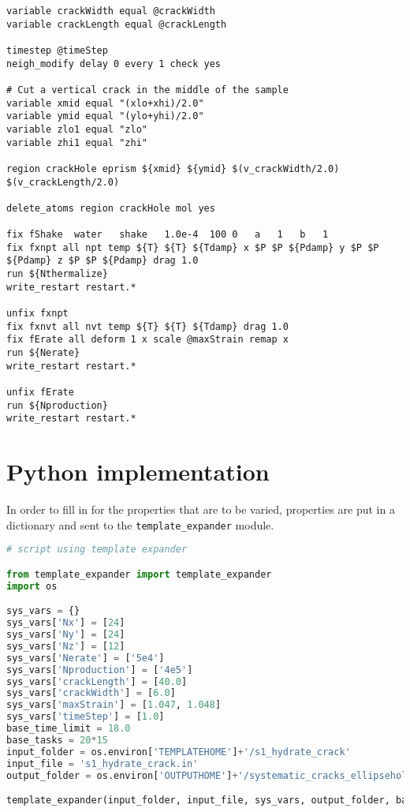\begin{lstlisting}[language=LammpsInput]
variable crackWidth equal @crackWidth
variable crackLength equal @crackLength

timestep @timeStep
neigh_modify delay 0 every 1 check yes

# Cut a vertical crack in the middle of the sample
variable xmid equal "(xlo+xhi)/2.0"
variable ymid equal "(ylo+yhi)/2.0"
variable zlo1 equal "zlo"
variable zhi1 equal "zhi"

region crackHole eprism ${xmid} ${ymid} $(v_crackWidth/2.0) $(v_crackLength/2.0)

delete_atoms region crackHole mol yes

fix	fShake	water 	shake 	1.0e-4  100	0 	a 	1 	b 	1
fix fxnpt all npt temp ${T} ${T} ${Tdamp} x $P $P ${Pdamp} y $P $P ${Pdamp} z $P $P ${Pdamp} drag 1.0
run ${Nthermalize}
write_restart restart.*

unfix fxnpt
fix fxnvt all nvt temp ${T} ${T} ${Tdamp} drag 1.0
fix fErate all deform 1 x scale @maxStrain remap x
run ${Nerate}
write_restart restart.*

unfix fErate
run ${Nproduction}
write_restart restart.*
\end{lstlisting}

\section{Python implementation}
In order to fill in for the properties that are to be varied, properties are put in a dictionary and sent to the {\tt template\_expander} module.
\begin{lstlisting}[language=Python]
# script using template expander

from template_expander import template_expander
import os

sys_vars = {}
sys_vars['Nx'] = [24]
sys_vars['Ny'] = [24]
sys_vars['Nz'] = [12]
sys_vars['Nerate'] = ['5e4']
sys_vars['Nproduction'] = ['4e5']
sys_vars['crackLength'] = [40.0]
sys_vars['crackWidth'] = [6.0]
sys_vars['maxStrain'] = [1.047, 1.048]
sys_vars['timeStep'] = [1.0]
base_time_limit = 18.0
base_tasks = 20*15
input_folder = os.environ['TEMPLATEHOME']+'/s1_hydrate_crack'
input_file = 's1_hydrate_crack.in'
output_folder = os.environ['OUTPUTHOME']+'/systematic_cracks_ellipsehole_thick'

template_expander(input_folder, input_file, sys_vars, output_folder, base_time_limit, base_tasks, account='myAccount')
\end{lstlisting}
 
